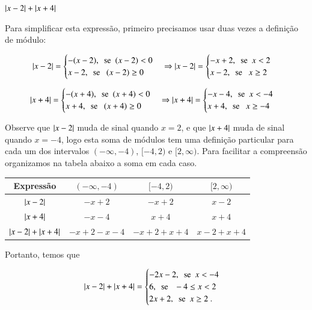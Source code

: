  \begin{exem}
  $\left|x-2\right| + \left|x+4\right|$ \label{eqmodulo}

 Para simplificar esta expressão, primeiro precisamos usar duas vezes a definição de módulo:

 \[ \left|x-2\right| = \begin{cases}
      -(x-2), \ \ \text{se} \ \ (x-2)< 0 \\
      x-2, \ \ \text{se } \ \ (x-2) \geq 0
     \end{cases}
     \Rightarrow
     \left|x-2\right| = \begin{cases}
      -x + 2, \ \ \text{se} \ \ x < 2 \\
      x-2, \ \ \text{se } \ \ x \geq 2
     \end{cases}
  \]

 \[ \left|x+4\right| = \begin{cases}
      -(x+4), \ \ \text{se} \ \ (x+4)< 0 \\
      x+4, \ \ \text{se } \ \ (x+4) \geq 0
     \end{cases}
     \Rightarrow
     \left|x+4\right| = \begin{cases}
      -x - 4, \ \ \text{se} \ \ x < -4 \\
      x + 4, \ \ \text{se } \ \ x \geq -4
     \end{cases}
  \]

  Observe que $\left|x-2\right|$ muda de sinal quando $x=2$, e que $\left|x+4\right|$ muda de sinal quando $x=-4$, logo esta soma de módulos tem uma definição particular para cada um dos intervalos $(-\infty, -4)$, $[-4, 2)$ e $[2, \infty)$. Para facilitar a compreensão organizamos na tabela abaixo a soma em cada caso.

   \begin{table}[H]
 \centering
 \begin{tabular}{|c|c|c|c|} \hline
 \rowcolor{cinza}
  Expressão & $(-\infty, -4)$ & $[-4, 2)$ & $[2, \infty)$  \\\hline
  $\left|x-2\right|$ & $-x+2$ &  $-x+2$ & $x-2$ \\\hline
  $\left|x+4\right|$ & $-x-4$ &  $x+4$ & $x+4$ \\\hline
  $\left|x-2\right| + \left|x+4\right|$ & $-x+2-x-4$ & $-x+2+x+4$ & $x-2+x+4$ \\\hline
 \end{tabular}
\end{table}

 Portanto, temos que

  \[ \left|x-2\right| + \left|x+4\right| = \begin{cases}
      -2x-2, \ \ \text{se} \ \ x < -4 \\
      6, \ \ \text{se } \ \ -4 \leq x < 2 \\
      2x + 2, \ \ \text{se} \ \ x \geq 2 \ .
     \end{cases}
  \]
 \end{exem}
 
